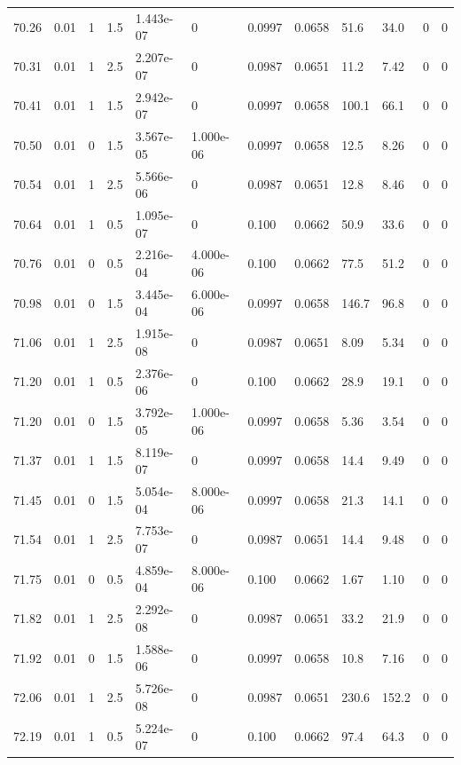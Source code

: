 \documentclass[preview]{standalone}
\begin{document}
{{{{{{{{{{{{{{{{\begin{tabular}{L{1.2cm}C{1.2cm} C{0.3cm}C{0.5cm} C{1.4cm}C{1.4cm} C{1.4cm}C{1.4cm} C{1.6cm}C{1.6cm} C{1.6cm}C{1.6cm}}
  70.26  &  0.01  & 1     & 1.5 &  1.443e-07  & 0  &  0.0997&   0.0658& 51.6 & 34.0   &  0 & 0  \\ 
  70.31  &  0.01  & 1     & 2.5 &  2.207e-07  & 0  &  0.0987&   0.0651& 11.2 & 7.42   &  0 & 0  \\ 
  70.41  &  0.01  & 1     & 1.5 &  2.942e-07  & 0  &  0.0997&   0.0658& 100.1 & 66.1   &  0 & 0  \\ 
  70.50  &  0.01  & 0     & 1.5 &  3.567e-05  & 1.000e-06  &  0.0997&   0.0658& 12.5 & 8.26   &  0 & 0  \\ 
  70.54  &  0.01  & 1     & 2.5 &  5.566e-06  & 0  &  0.0987&   0.0651& 12.8 & 8.46   &  0 & 0  \\ 
  70.64  &  0.01  & 1     & 0.5 &  1.095e-07  & 0  &  0.100&   0.0662& 50.9 & 33.6   &  0 & 0  \\ 
  70.76  &  0.01  & 0     & 0.5 &  2.216e-04  & 4.000e-06  &  0.100&   0.0662& 77.5 & 51.2   &  0 & 0  \\ 
  70.98  &  0.01  & 0     & 1.5 &  3.445e-04  & 6.000e-06  &  0.0997&   0.0658& 146.7 & 96.8   &  0 & 0  \\ 
  71.06  &  0.01  & 1     & 2.5 &  1.915e-08  & 0  &  0.0987&   0.0651& 8.09 & 5.34   &  0 & 0  \\ 
  71.20  &  0.01  & 1     & 0.5 &  2.376e-06  & 0  &  0.100&   0.0662& 28.9 & 19.1   &  0 & 0  \\ 
  71.20  &  0.01  & 0     & 1.5 &  3.792e-05  & 1.000e-06  &  0.0997&   0.0658& 5.36 & 3.54   &  0 & 0  \\ 
  71.37  &  0.01  & 1     & 1.5 &  8.119e-07  & 0  &  0.0997&   0.0658& 14.4 & 9.49   &  0 & 0  \\ 
  71.45  &  0.01  & 0     & 1.5 &  5.054e-04  & 8.000e-06  &  0.0997&   0.0658& 21.3 & 14.1   &  0 & 0  \\ 
  71.54  &  0.01  & 1     & 2.5 &  7.753e-07  & 0  &  0.0987&   0.0651& 14.4 & 9.48   &  0 & 0  \\ 
  71.75  &  0.01  & 0     & 0.5 &  4.859e-04  & 8.000e-06  &  0.100&   0.0662& 1.67 & 1.10   &  0 & 0  \\ 
  71.82  &  0.01  & 1     & 2.5 &  2.292e-08  & 0  &  0.0987&   0.0651& 33.2 & 21.9   &  0 & 0  \\ 
  71.92  &  0.01  & 0     & 1.5 &  1.588e-06  & 0  &  0.0997&   0.0658& 10.8 & 7.16   &  0 & 0  \\ 
  72.06  &  0.01  & 1     & 2.5 &  5.726e-08  & 0  &  0.0987&   0.0651& 230.6 & 152.2   &  0 & 0  \\ 
  72.19  &  0.01  & 1     & 0.5 &  5.224e-07  & 0  &  0.100&   0.0662& 97.4 & 64.3   &  0 & 0  \\ 

\end{tabular}}}}}}}}}}}}}}}}}
\end{document}
